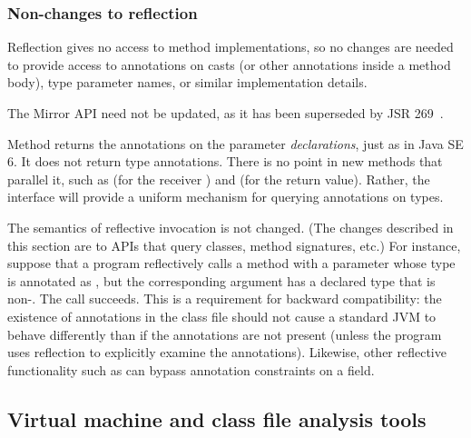 \documentclass[10pt]{article}
\begin{document}


\subsubsection{Non-changes to reflection\label{non-changes-to-reflection}}

Reflection gives no access to method implementations, so no changes are
needed to
provide access to annotations on casts (or other annotations inside
a method body), type parameter names, or similar implementation details.


The Mirror API  need not be updated, as it has been
superseded by JSR 269~\cite{JSR269}.


Method  returns the annotations on
the parameter \emph{declarations}, just as in Java SE 6.  It does not return
type annotations.  There is no point in new methods that parallel it,
such as  (for the receiver
) and  (for the return
value).  Rather, the interface will provide a uniform mechanism for
querying annotations on types.


The semantics of reflective invocation is not changed.
(The changes described in this section are to APIs that query classes,
method signatures, etc.)
For instance, suppose that a program reflectively calls a method
with a parameter whose type is annotated as , but the
corresponding argument has a declared type that is non-.
The call succeeds.  This is a requirement for backward compatibility:  the
existence of annotations in the class file should not cause a standard JVM
to behave differently than if the annotations are not present (unless the
program uses reflection to explicitly examine the annotations).  Likewise,
other reflective functionality such as 
can bypass annotation constraints on a field.



\subsection{Virtual machine and class file analysis tools\label{class-file-tools}}
\end{document}
